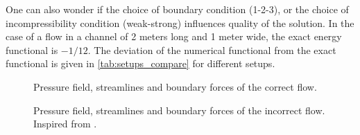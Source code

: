 \documentclass[11 pt]{report}
\begin{document}
One can also wonder if the choice of boundary condition (1-2-3), or the choice of incompressibility condition (weak-strong) influences quality of the solution. In the case of a flow in a channel of 2 meters long and 1 meter wide, the exact energy functional is $-1/12$. The deviation of the numerical functional from the exact functional is given in \cref{tab:setups_compare} for different setups.

%         
%         
\begin{figure}[H]
    \centering
    
    \caption{Pressure field, streamlines and boundary forces of the correct flow.}
    \label{fig:bc_issue_good}
\end{figure}
\begin{figure}[H]
    \centering
    
    \caption{Pressure field, streamlines and boundary forces of the incorrect flow. Inspired from \cite{stokesBC}.}
    \label{fig:bc_issue_bad}
\end{figure}
\end{document}
